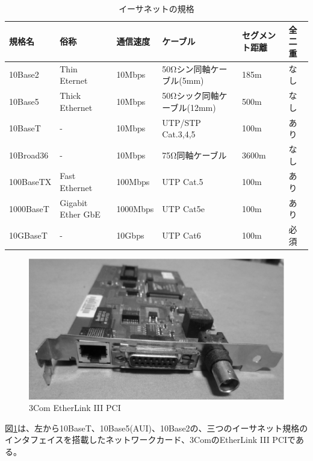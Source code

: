 \begin{table}[htbp]  \label{ethernet}
\begin{center}
\begin{tabularx}{110mm}{XXXXXX} \toprule
規格名 & 俗称 & 通信速度 & ケーブル & セグメント距離 & 全二重\\ \midrule
10Base2 & Thin Eternet & 10Mbps & 50Ωシン同軸ケーブル(5mm) & 185m & なし \\
10Base5 & Thick Ethernet & 10Mbps & 50Ωシック同軸ケーブル(12mm) & 500m & なし \\
10BaseT &- & 10Mbps & UTP/STP Cat.3,4,5 & 100m & あり\\
10Broad36 & - &10Mbps & 75Ω同軸ケーブル & 3600m & なし\\
100BaseTX & Fast Ethernet & 100Mbps & UTP Cat.5 & 100m & あり\\
1000BaseT &Gigabit Ether GbE & 1000Mbps & UTP Cat5e & 100m & あり\\
10GBaseT & - & 10Gbps & UTP Cat6 & 100m & 必須\\ \bottomrule
\end{tabularx}
\end{center} \caption{イーサネットの規格}
\end{table}

\begin{figure}[htbp]
	\includegraphics[width=12cm,clip]{draw/3com.eps}
	\caption{3Com EtherLink III PCI}
	\label{fig:3com}
\end{figure}

図\ref{fig:3com}は、左から10BaseT、10Base5(AUI)、10Base2の、三つのイーサネット規格のインタフェイスを搭載したネットワークカード、3ComのEtherLink III PCIである。

